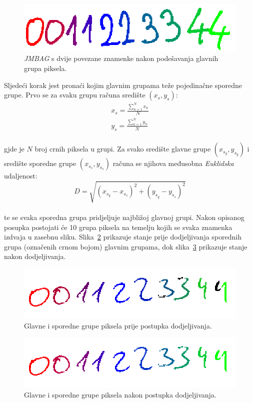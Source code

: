 \begin{figure}[htb]
    \centering
    \includegraphics[width=12cm]{images/segmentation-after-division.png}
    \caption{\emph{JMBAG} s dvije povezane znamenke nakon podešavanja glavnih grupa piksela.}
    \label{fig:segmentation-after-division}
\end{figure}
Sljedeći korak jest pronaći kojim glavnim grupama teže pojedinačne sporedne grupe. Prvo se za svaku grupu računa
središte $(x_s, y_s)$:\\
\begin{align*}
    x_s = \frac{\sum_{n = 1}^{N} x_n}{N}\\
    y_s = \frac{\sum_{n = 1}^{N} y_n}{N}
\end{align*}\\
gjde je $N$ broj crnih piksela u grupi. Za svako središte glavne grupe $(x_{s_g}, y_{s_g})$ i središte sporedne grupe
$(x_{s_s}, y_{s_s})$ računa se njihova međusobna \emph{Euklidska} udaljenost:\\
\begin{equation*}
    D = \sqrt{(x_{s_g} - x_{s_s})^{2} + (y_{s_g} - y_{s_s})^{2}}
\end{equation*}\\
te se svaka sporedna grupa pridjeljuje najbližoj glavnoj grupi. Nakon opisanog posupka postojati će 10 grupa piksela
na temelju kojih se svaka znamenka izdvaja u zasebnu sliku. Slika\ \ref{fig:unassigned-minor-groups} prikazuje stanje
prije dodjeljivanja sporednih grupa (označenih crnom bojom) glavnim grupama, dok slika\ \ref{fig:assigned-minor-groups}
prikazuje stanje nakon dodjeljivanja.
\begin{figure}[htb]
    \centering
    \includegraphics[width=12cm]{images/unassigned-minor-groups.png}
    \caption{Glavne i sporedne grupe piksela prije postupka dodjeljivanja.}
    \label{fig:unassigned-minor-groups}
\end{figure}
\begin{figure}[htb]
    \centering
    \includegraphics[width=12cm]{images/assigned-minor-groups.png}
    \caption{Glavne i sporedne grupe piksela nakon postupka dodjeljivanja.}
    \label{fig:assigned-minor-groups}
\end{figure}


